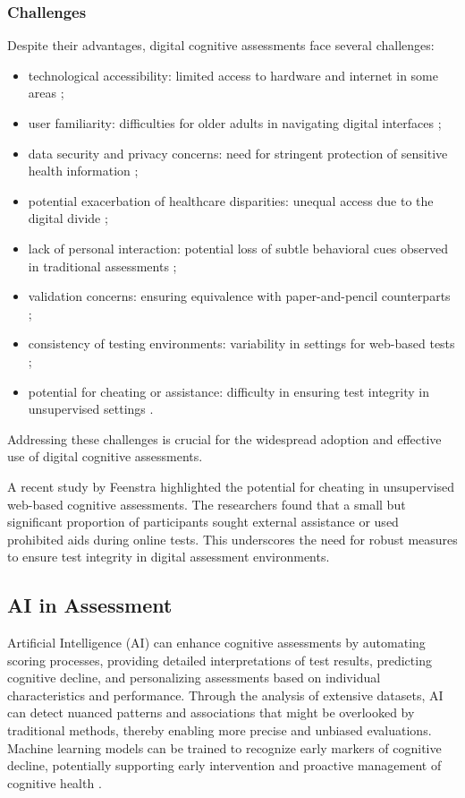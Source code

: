 \subsubsection{Challenges}
Despite their advantages, digital cognitive assessments face several challenges:
\begin{itemize}
\item technological accessibility: limited access to hardware and internet in some areas \cite{Bauer2012};
\item user familiarity: difficulties for older adults in navigating digital interfaces \cite{Zygouris2017};
\item data security and privacy concerns: need for stringent protection of sensitive health information \cite{Bhuyan2017};
\item potential exacerbation of healthcare disparities: unequal access due to the digital divide \cite{Rajkomar2018};
\item lack of personal interaction: potential loss of subtle behavioral cues observed in traditional assessments \cite{Bauer2012};
\item validation concerns: ensuring equivalence with paper-and-pencil counterparts \cite{Wild2021};
\item consistency of testing environments: variability in settings for web-based tests \cite{Geddes2020};
\item potential for cheating or assistance: difficulty in ensuring test integrity in unsupervised settings \cite{Feenstra2017}.
\end{itemize}
Addressing these challenges is crucial for the widespread adoption and effective use of digital cognitive assessments.

A recent study by Feenstra \cite{Feenstra2017} highlighted the potential for cheating in unsupervised web-based cognitive assessments. The researchers found that a small but significant proportion of participants sought external assistance or used prohibited aids during online tests. This underscores the need for robust measures to ensure test integrity in digital assessment environments.

\subsection{AI in Assessment}
Artificial Intelligence (AI) can enhance cognitive assessments by automating scoring processes, providing detailed interpretations of test results, predicting cognitive decline, and personalizing assessments based on individual characteristics and performance. Through the analysis of extensive datasets, AI can detect nuanced patterns and associations that might be overlooked by traditional methods, thereby enabling more precise and unbiased evaluations. Machine learning models can be trained to recognize early markers of cognitive decline, potentially supporting early intervention and proactive management of cognitive health \cite{Rabinowitz2019}.

